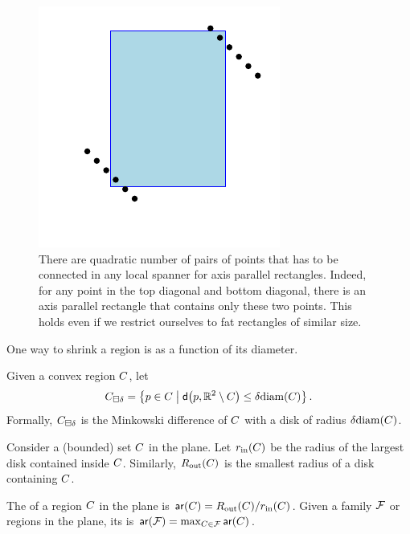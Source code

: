\documentclass[12pt]{article}%
\begin{document}
\begin{figure}
    \centerline{\includegraphics{figs/local_rectangles}}
    \caption{There are quadratic number of pairs of points that has to
       be connected in any local spanner for axis parallel
       rectangles. Indeed, for any point in the top diagonal and
       bottom diagonal, there is an axis parallel rectangle that
       contains only these two points. This holds even if we restrict
       ourselves to fat rectangles of similar size.}
\end{figure}




One way to shrink a region is as a function of its diameter.

\begin{defn}
    Given a convex region $C$, let
    \begin{equation*}
        \shrinkDY{\body}{\delta}%
        =%
        \Set{ \pa \in \body }{ \dsY{\pa}{ \Re^2 \setminus \body} \leq \delta
           \diameterX{\body}}.        
    \end{equation*}
    Formally, $C_{\boxminus \delta}$ is the Minkowski difference
    of $C$ with a disk of radius $\delta \diameterX{\body}$.
\end{defn}


\begin{defn}
    Consider a (bounded) set $C$ in the plane. Let $\rinX{\body}$
    be the radius of the largest disk contained inside $C$.
    Similarly, $\routX{\body}$ is the smallest radius of a disk
    containing $C$.

    The  of a region $C$ in the plane is
    $\arX{\body} = \routX{\body}/\rinX{\body}$. Given a family $\mathcal{F}$
    or regions in the plane, its  is
    $\arX{\FF} = \max_{\body \in \FF} \arX{\body}$.
\end{defn}
\end{document}
